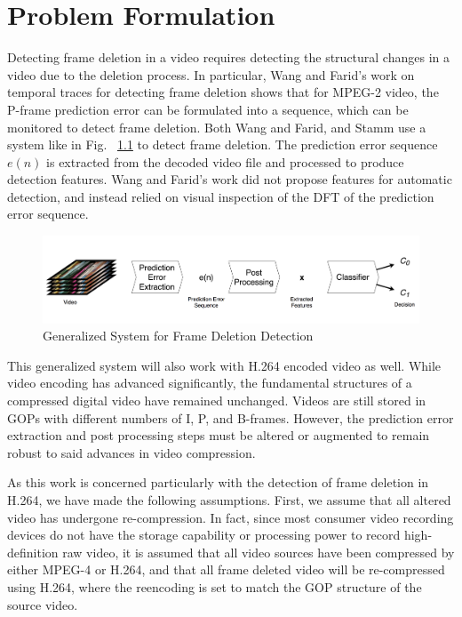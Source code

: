 \chapter{Problem Formulation}

Detecting frame deletion in a video requires detecting the structural changes in a video due to the deletion process. In particular, Wang and Farid's work on temporal traces for detecting frame deletion shows that for MPEG-2 video, the P-frame prediction error can be formulated into a sequence, which can be monitored to detect frame deletion. Both Wang and Farid, and Stamm use a system like in Fig. ~\ref{System} to detect frame deletion. The prediction error sequence $e(n)$ is extracted from the decoded video file and processed to produce detection features. Wang and Farid's work did not propose features for automatic detection, and instead relied on visual inspection of the DFT of the prediction error sequence.

\begin{figure}[htbp]
\centerline{\includegraphics[width=0.9\linewidth]{ProblemFormulation/frame_deletion_detection_system.png}}
\caption{Generalized System for Frame Deletion Detection}
\label{System}
\end{figure}

This generalized system will also work with H.264 encoded video as well. While video encoding has advanced significantly, the fundamental structures of a compressed digital video have remained unchanged. Videos are still stored in GOPs with different numbers of I, P, and B-frames. However, the prediction error extraction and post processing steps must be altered or augmented to remain robust to said advances in video compression.

As this work is concerned particularly with the detection of frame deletion in H.264, we have made the following assumptions. First, we assume that all altered video has undergone re-compression. In fact, since most consumer video recording devices do not have the storage capability or processing power to record high-definition raw video, it is assumed that all video sources have been compressed by either MPEG-4 or H.264, and that all frame deleted video will be re-compressed using H.264, where the reencoding is set to match the GOP structure of the source video. 

